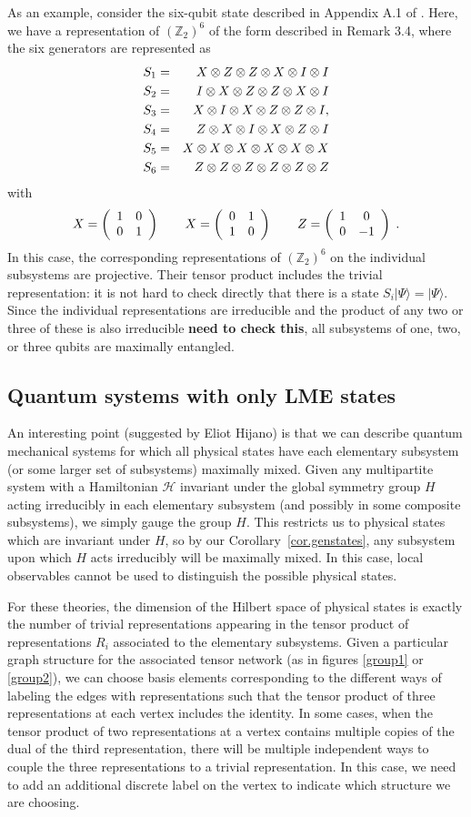 \documentclass[12pt]{article}
\theoremstyle{definition}
\newcommand{\be}{\begin{equation}}
\newcommand{\ee}{\end{equation}}
\newcommand{\bea}{\begin{eqnarray}}
\newcommand{\eea}{\end{eqnarray}}
\newcommand{\ba}{\begin{array}}
\newcommand{\ea}{\end{array}}
\begin{document}
As an example, consider the six-qubit state described in Appendix A.1 of \cite{Pastawski:2015qua}. Here, we have a representation of $(\mathbb{Z}_2)^6$ of the form described in Remark 3.4, where the six generators are represented as
\bea
S_1 &=& X  \otimes Z  \otimes Z \otimes X \otimes I \otimes I \cr
S_2 &=& I \otimes X \otimes Z \otimes Z \otimes X \otimes I \cr
S_3 &=& X \otimes I \otimes X \otimes Z \otimes Z \otimes I, \cr
S_4 &=& Z \otimes X \otimes I \otimes X \otimes Z \otimes I \cr
S_5 &=& X \otimes X \otimes X \otimes X \otimes X \otimes X \cr
S_6 &=& Z \otimes Z \otimes Z \otimes Z \otimes Z \otimes Z 
\eea
with 
\be
X = \left(\ba{cc}1&0 \cr 0&1\ea\right) \qquad X = \left(\ba{cc}0&1 \cr 1&0\ea\right) \qquad Z = \left(\ba{cc}1&0 \cr 0&-1\ea\right) \; .
\ee
In this case, the corresponding representations of $(\mathbb{Z}_2)^6$ on the individual subsystems are projective. Their tensor product includes the trivial representation: it is not hard to check directly that there is a state $S_i |\Psi \rangle = |\Psi \rangle$. Since the individual representations are irreducible and the product of any two or three of these is also irreducible {\bf need to check this}, all subsystems of one, two, or three qubits are maximally entangled.

\subsection{Quantum systems with only LME states}

An interesting point (suggested by Eliot Hijano) is that we can describe quantum mechanical systems for which all physical states have each elementary subsystem (or some larger set of subsystems) maximally mixed. Given any multipartite system with a Hamiltonian ${\mathcal H}$ invariant under the global symmetry group $H$ acting irreducibly in each elementary subsystem (and possibly in some composite subsystems), we simply gauge the group $H$. This restricts us to physical states which are invariant under $H$, so by our Corollary~\ref{cor.genstates}, any subsystem upon which $H$ acts irreducibly will be maximally mixed. In this case, local observables cannot be used to distinguish the possible physical states. 

For these theories, the dimension of the Hilbert space of physical states is exactly the number of trivial representations appearing in the tensor product of representations $R_i$ associated to the elementary subsystems. Given a particular graph structure for the associated tensor network (as in figures \ref{group1} or \ref{group2}), we can choose basis elements corresponding to the different ways of labeling the edges with representations such that the tensor product of three representations at each vertex includes the identity. In some cases, when the tensor product of two representations at a vertex contains multiple copies of the dual of the third representation, there will be multiple independent ways to couple the three representations to a trivial representation. In this case, we need to add an additional discrete label on the vertex to indicate which structure we are choosing.
\end{document}
